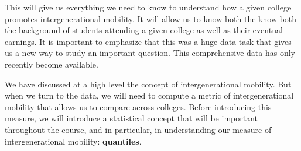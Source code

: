 \documentclass[
]{book}
\begin{document}
This will give us everything we need to know to understand how a given college promotes intergenerational mobility. It will allow us to know both the know both the background of students attending a given college as well as their eventual earnings. It is important to emphasize that this was a huge data task that gives us a new way to study an important question. This comprehensive data has only recently become available.

We have discussed at a high level the concept of intergenerational mobility. But when we turn to the data, we will need to compute a metric of intergenerational mobility that allows us to compare across colleges. Before introducing this measure, we will introduce a statistical concept that will be important throughout the course, and in particular, in understanding our measure of intergenerational mobility: \textbf{quantiles}.

  
\end{document}
